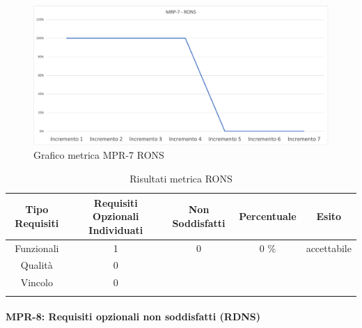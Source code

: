 \begin{center}
        \begin{figure}[!htb]
        \centering
        \includegraphics[scale=0.40]{res/images/RQRONS.png}
        \caption{Grafico metrica MPR-7 RONS}
    \end{figure}
    \begin{center}
    \end{center}
\end{center}

\begin{center}
    \begin{longtable}{|c|c|c|c|c|}
        \hline
        \rowcolor{lighter-grayer}
        \textbf {Tipo Requisiti} & \textbf{Requisiti Opzionali Individuati} & \textbf{Non Soddisfatti} & \textbf{Percentuale} & \textbf{Esito} \\        \hline
        \endfirsthead

        \hline
        Funzionali & 1 & 0 & 0 \%  &  accettabile        \\
        Qualità & 0 &  &  &                        \\
        Vincolo & 0 & & &                        \\  
        \hline
        \rowcolor{white}
        \caption{Risultati metrica RONS}
    \end{longtable}
\end{center}


\newpage
\paragraph{MPR-8: Requisiti opzionali non soddisfatti (RDNS)}\label{_SV}


